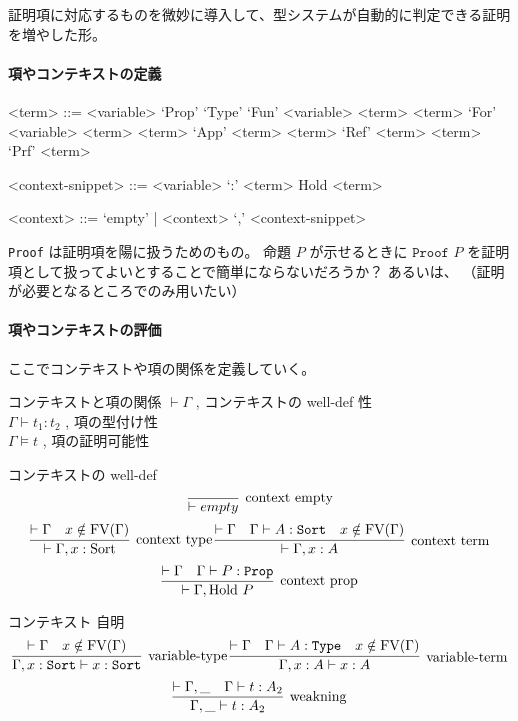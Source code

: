 証明項に対応するものを微妙に導入して、型システムが自動的に判定できる証明を増やした形。

\paragraph*{項やコンテキストの定義}
\begin{grammar}
<term> ::= <variable> 
\alt `Prop'
\alt `Type'
\alt `Fun' <variable> <term> <term>
\alt `For' <variable> <term> <term>
\alt `App' <term> <term>
\alt `Ref' <term> <term>
\alt `Prf' <term>

<context-snippet> ::= <variable> `:' <term>
\alt Hold <term>

<context> ::= `empty' | <context> `,' <context-snippet>
\end{grammar}

\texttt{Proof} は証明項を陽に扱うためのもの。
命題 \(P\) が示せるときに \(\texttt{Proof } P\) を証明項として扱ってよいとすることで簡単にならないだろうか？
あるいは、
（証明が必要となるところでのみ用いたい）

\paragraph*{項やコンテキストの評価}
ここでコンテキストや項の関係を定義していく。

\begin{itembox}[l]{コンテキストと項の関係}
  \(\vdash \Gamma\) , コンテキストの well-def 性 \\
  \(\Gamma \vdash t_1 : t_2\) , 項の型付け性 \\
  \(\Gamma \vDash t\) , 項の証明可能性
\end{itembox}

\begin{itembox}[l]{コンテキストの well-def}
  \[\infer[\text{context empty}]{\vdash empty}{}\]
  \[
    \infer[\text{context type}]{\vdash \Gamma , x : \text{Sort}}{\vdash \Gamma & x \notin \text{FV}(\Gamma)}\,
    \infer[\text{context term}]{\vdash \Gamma , x : A}{\vdash \Gamma & \Gamma \vdash A : \texttt{Sort} & x \notin \text{FV}(\Gamma)}\]
  \[\infer[\text{context prop}]{\vdash \Gamma , \text{Hold } P}{\vdash \Gamma & \Gamma \vdash P : \texttt{Prop}}\]
\end{itembox}

\begin{itembox}[l]{コンテキスト 自明}
  \[
    \infer[\text{variable-type}]{\Gamma , x : \texttt{Sort} \vdash x : \texttt{Sort}}{\vdash \Gamma & x \notin \text{FV}(\Gamma)} \,
    \infer[\text{variable-term}]{\Gamma , x : A \vdash x : A}{\vdash \Gamma & \Gamma \vdash A : \texttt{Type} & x \notin \text{FV}(\Gamma)}\]
  \[\infer[\text{weakning}]{\Gamma , \_ \vdash t : A_2}{\vdash \Gamma , \_ & \Gamma \vdash t : A_2} \]
\end{itembox}

